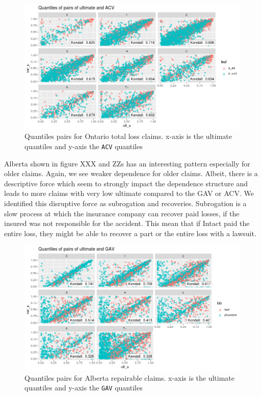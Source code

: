 	\begin{figure}[H]
		\begin{center}
			\includegraphics[scale=0.4]{Graphiques/on_tl} 
			\renewcommand{\figurename}{Figure}
			\caption{Quantiles pairs for Ontario total loss claims. x-axis is the ultimate quantiles and y-axis the \texttt{ACV} quantiles}\label{Fig_copula_on_tl}
		\end{center}
	\end{figure}
	
	Alberta shown in figure XXX and ZZs has an interesting pattern especially for older claims. Again, we see weaker dependence for older claims. Albeit, there is a descriptive force which seem to strongly impact the dependence structure and leads to more claims with very low ultimate compared to the GAV or ACV. We identified this disruptive force as subrogation and recoveries. Subrogation is a slow process at which the insurance company can recover paid losses, if the insured was not responsible for the accident. This mean that if Intact paid the entire loss, they might be able to recover a part or the entire loss with a lawsuit. 
	
	\begin{figure}[H]
		\begin{center}
			\includegraphics[scale=0.4]{Graphiques/ab_rep} 
			\renewcommand{\figurename}{Figure}
			\caption{Quantiles pairs for Alberta repairable claims. x-axis is the ultimate quantiles and y-axis the \texttt{GAV} quantiles}\label{Fig_copula_ab_rep}
		\end{center}
	\end{figure}
	
